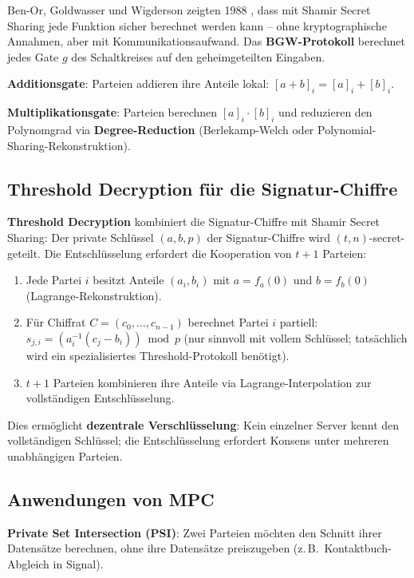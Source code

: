 ﻿\documentclass[a4paper,12pt]{scrreprt}
\theoremstyle{definition}
\begin{document}
Ben-Or, Goldwasser und Wigderson zeigten 1988 \cite{BGW88}, dass mit Shamir Secret Sharing jede Funktion sicher berechnet werden kann -- ohne kryptographische Annahmen, aber mit Kommunikationsaufwand. Das \textbf{BGW-Protokoll} berechnet jedes Gate $g$ des Schaltkreises auf den geheimgeteilten Eingaben.

\textbf{Additionsgate}: Parteien addieren ihre Anteile lokal: $[a+b]_i = [a]_i + [b]_i$.

\textbf{Multiplikationsgate}: Parteien berechnen $[a]_i \cdot [b]_i$ und reduzieren den Polynomgrad via \textbf{Degree-Reduction} (Berlekamp-Welch oder Polynomial-Sharing-Rekonstruktion).

\subsection{Threshold Decryption für die Signatur-Chiffre}

\textbf{Threshold Decryption} kombiniert die Signatur-Chiffre mit Shamir Secret Sharing: Der private Schlüssel $(a, b, p)$ der Signatur-Chiffre wird $(t,n)$-secret-geteilt. Die Entschlüsselung erfordert die Kooperation von $t+1$ Parteien:

\begin{enumerate}
    \item Jede Partei $i$ besitzt Anteile $(a_i, b_i)$ mit $a = f_a(0)$ und $b = f_b(0)$ (Lagrange-Rekonstruktion).
    \item Für Chiffrat $C = (c_0,\ldots,c_{n-1})$ berechnet Partei $i$ partiell: $s_{j,i} = (a_i^{-1}(c_j - b_i))\bmod p$ (nur sinnvoll mit vollem Schlüssel; tatsächlich wird ein spezialisiertes Threshold-Protokoll benötigt).
    \item $t+1$ Parteien kombinieren ihre Anteile via Lagrange-Interpolation zur vollständigen Entschlüsselung.
\end{enumerate}

Dies ermöglicht \textbf{dezentrale Verschlüsselung}: Kein einzelner Server kennt den vollständigen Schlüssel; die Entschlüsselung erfordert Konsens unter mehreren unabhängigen Parteien.

\subsection{Anwendungen von MPC}

\textbf{Private Set Intersection (PSI)}: Zwei Parteien möchten den Schnitt ihrer Datensätze berechnen, ohne ihre Datensätze preiszugeben (z.\,B.\ Kontaktbuch-Abgleich in Signal).
\end{document}
